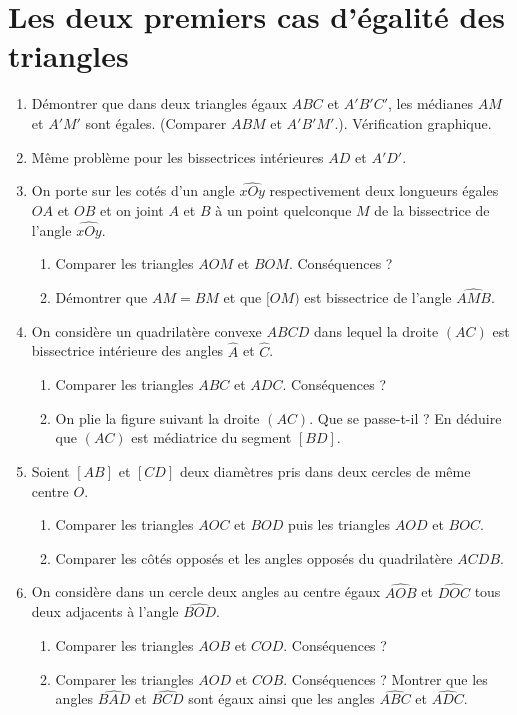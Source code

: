 
\chapter{Les deux premiers cas d'égalité des triangles} 
\begin{enumerate}
\item Démontrer que dans deux triangles égaux $ABC$ et $A'B'C'$, les médianes $AM$ et $A'M'$ sont égales. (Comparer $ABM$ et $A'B'M'$.). Vérification graphique. 
\item Même problème pour les bissectrices intérieures $AD$ et $A'D'$.
\item On porte sur les cotés d'un angle $\widehat{xOy}$ respectivement deux longueurs égales $OA$ et $OB$ et on joint $A$ et $B$ à un point quelconque $M$ de la bissectrice de l'angle $\widehat{xOy}$.\begin{enumerate}
\item Comparer les triangles $AOM$ et $BOM$. Conséquences ? 
\item Démontrer que $AM=BM$ et que $[OM)$ est bissectrice de l'angle $\widehat{AMB}$.
\end{enumerate}
\item On considère un quadrilatère convexe $ABCD$ dans lequel la droite $(AC)$ est bissectrice intérieure des angles $\widehat{A}$ et $\widehat{C}$. 
\begin{enumerate}
\item Comparer les triangles $ABC$ et $ADC$. Conséquences ? 
\item On plie la figure suivant la droite $(AC)$. Que se passe-t-il ? En déduire que $(AC)$ est médiatrice du segment $[BD]$. 
\end{enumerate}
\item Soient $[AB]$ et $[CD]$ deux diamètres pris dans deux cercles de même centre $O$.\begin{enumerate}
\item Comparer les triangles $AOC$ et $BOD$ puis les triangles $AOD$ et $BOC$. 
\item Comparer les côtés opposés et les angles opposés du quadrilatère $ACDB$.
\end{enumerate}
\item On considère dans un cercle deux angles au centre égaux $\widehat{AOB}$ et
$\widehat{DOC}$ tous deux adjacents à l'angle $\widehat{BOD}$. 
\begin{enumerate}
\item Comparer les triangles $AOB$ et $COD$. Conséquences ? 
\item Comparer les triangles $AOD$ et $COB$. Conséquences ? Montrer que les angles $\widehat{BAD}$ et $\widehat{BCD}$ sont égaux ainsi que les angles $\widehat{ABC}$ et $\widehat{ADC}$. 

\end{enumerate}
\end{enumerate}
